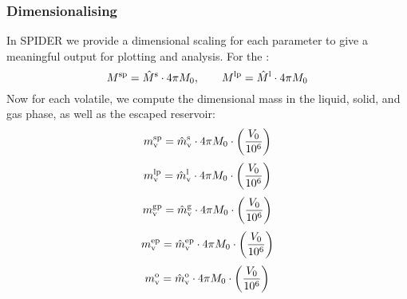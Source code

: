 \subsubsection{Dimensionalising}
In SPIDER we provide a dimensional scaling for each parameter to give a meaningful output for plotting and analysis.  For the :
\begin{equation}
M^{\rm sp} = \hat{M}^{\rm s} \cdot 4 \pi M_0, \qquad M^{\rm lp} = \hat{M}^{\rm l} \cdot 4 \pi M_0
\end{equation}
Now for each volatile, we compute the dimensional mass in the liquid, solid, and gas phase, as well as the escaped reservoir:
\begin{equation}
m_{\rm v}^{\rm sp} = \hat{m}_{\rm v}^{\rm s} \cdot 4 \pi M_0 \cdot \left( \frac{V_0}{10^6} \right)
\end{equation}
\begin{equation}
m_{\rm v}^{\rm lp} = \hat{m}_{\rm v}^{\rm l} \cdot 4 \pi M_0 \cdot \left( \frac{V_0}{10^6} \right)
\end{equation}
\begin{equation}
m_{\rm v}^{\rm gp} = \hat{m}_{\rm v}^{\rm g} \cdot 4 \pi M_0 \cdot \left( \frac{V_0}{10^6} \right)
\end{equation}
\begin{equation}
m_{\rm v}^{\rm ep} = \hat{m}_{\rm v}^{\rm ep} \cdot 4 \pi M_0 \cdot \left( \frac{V_0}{10^6} \right)
\end{equation}
\begin{equation}
m_{\rm v}^{\rm o} = \hat{m}_{\rm v}^{\rm o} \cdot 4 \pi M_0 \cdot \left( \frac{V_0}{10^6} \right)
\end{equation}
